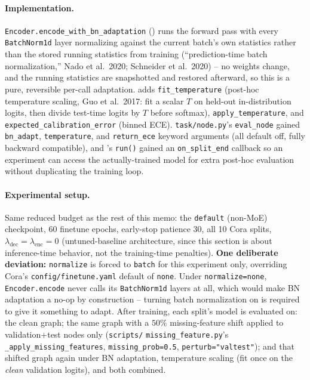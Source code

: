\documentclass{article}
\begin{document}
\paragraph{Implementation.} \texttt{Encoder.encode\_with\_bn\_adaptation}
() runs the forward pass with every
\texttt{BatchNorm1d} layer normalizing against the current batch's own
statistics rather than the stored running statistics from training
(``prediction-time batch normalization,'' Nado et al.\ 2020; Schneider et
al.\ 2020) -- no weights change, and the running statistics are snapshotted
and restored afterward, so this is a pure, reversible per-call adaptation.
 adds \texttt{fit\_temperature} (post-hoc
temperature scaling, Guo et al.\ 2017: fit a scalar $T$ on held-out
in-distribution logits, then divide test-time logits by $T$ before
softmax), \texttt{apply\_temperature}, and
\texttt{expected\_calibration\_error} (binned ECE). \texttt{task/node.py}'s
\texttt{eval\_node} gained \texttt{bn\_adapt}, \texttt{temperature}, and
\texttt{return\_ece} keyword arguments (all default off, fully backward
compatible), and 's \texttt{run()} gained an
\texttt{on\_split\_end} callback so an experiment can access the
actually-trained model for extra post-hoc evaluation without duplicating
the training loop.

\paragraph{Experimental setup.} Same reduced budget as the rest of this
memo: the \texttt{default} (non-MoE) checkpoint, 60 finetune epochs,
early-stop patience 30, all 10 Cora splits, $\lambda_{\text{dec}} =
\lambda_{\text{enc}} = 0$ (untuned-baseline architecture, since this
section is about inference-time behavior, not the training-time
penalties). \textbf{One deliberate deviation:} \texttt{normalize} is
forced to \texttt{batch} for this experiment only, overriding Cora's
\texttt{config/finetune.yaml} default of \texttt{none}. Under
\texttt{normalize=none}, \texttt{Encoder.encode} never calls its
\texttt{BatchNorm1d} layers at all, which would make BN adaptation a
no-op by construction -- turning batch normalization on is required to
give it something to adapt. After training, each split's model is
evaluated on: the clean graph; the same graph with a $50\%$ missing-feature
shift applied to validation+test nodes only (\texttt{scripts/}
\texttt{missing\_feature.py}'s \texttt{\_apply\_missing\_features},
\texttt{missing\_prob=0.5}, \texttt{perturb=}\texttt{"valtest"}); and that
shifted graph again under BN adaptation, temperature scaling (fit once on
the \emph{clean} validation logits), and both combined.
\end{document}
